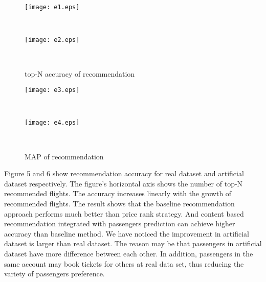 \documentclass{sig-alternate-05-2015}
\begin{document}
\begin{figure}[!h]
              \begin{minipage}[t]{0.47\linewidth}
              \centering
              \texttt{[image: e1.eps]}\\
              \label{Price_Distribution}
              \end{minipage}
              \begin{minipage}[t]{0.005\linewidth}~~~
              \end{minipage}
              \begin{minipage}[t]{0.47\linewidth}
              \centering
              \texttt{[image: e2.eps]}\\
              \label{Departure_Time_Distribution}
              \end{minipage}
              \begin{minipage}[t]{0.005\linewidth}~~~
              \end{minipage}
              \caption{top-N accuracy of recommendation}
          \label{total_rank}
          \vspace{-0.4cm}
\end{figure}
\begin{figure}[!h]
              \begin{minipage}[t]{0.47\linewidth}
              \centering
              \texttt{[image: e3.eps]}\\
              \label{Price_Distribution}
              \end{minipage}
              \begin{minipage}[t]{0.005\linewidth}~~~
              \end{minipage}
              \begin{minipage}[t]{0.47\linewidth}
              \centering
              \texttt{[image: e4.eps]}\\
              \label{Departure_Time_Distribution}
              \end{minipage}
              \begin{minipage}[t]{0.005\linewidth}~~~
              \end{minipage}
              \caption{MAP of recommendation}
          \label{total_rank}
          \vspace{-0.4cm}
\end{figure}\par
Figure 5 and 6 show recommendation accuracy for real dataset and artificial dataset respectively. The figure's horizontal axis shows the number of top-N recommended flights. The accuracy increases linearly with the growth of recommended flights. The result shows that the baseline recommendation approach performs much better than price rank strategy. And content based recommendation integrated with passengers prediction can achieve higher accuracy than baseline method. We have noticed the improvement in artificial dataset is larger than real dataset. The reason may be that passengers in artificial dataset have more difference between each other. In addition, passengers in the same account may book tickets for others at real data set, thus reducing the variety of passengers preference.
\end{document}
